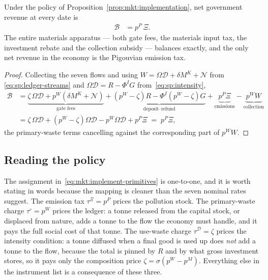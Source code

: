 \begin{corollary}\label{cor:mkt:budget}
Under the policy of Proposition~\ref{prop:mkt:implementation}, net government revenue at every date is
\begin{align}
\mathcal B &= p^P\,\Xi .
\label{eq:mkt:budget}
\end{align}
The entire materials apparatus --- both gate fees, the materials input tax, the investment rebate and
the collection subsidy --- balances exactly, and the only net revenue in the economy is the Pigouvian
emission tax.
\end{corollary}

\begin{proof}
Collecting the seven flows and using $W=\Omega\mathcal D+\delta M^K+\mathcal N$ from
\eqref{eq:sp:ledger-streams} and $\Omega\mathcal D=R-\Phi^IG$ from~\eqref{eq:sp:intensity},
\begin{align*}
\mathcal B &= \underbrace{\zeta\,\Omega\mathcal D+p^W\left(\delta M^K+\mathcal N\right)}_{\text{gate fees}}
+\underbrace{\left(p^W-\zeta\right)R-\Phi^I\left(p^W-\zeta\right)G}_{\text{deposit--refund}}
+\underbrace{p^P\Xi}_{\text{emissions}}
-\underbrace{p^WW}_{\text{collection}}
\\
&= \zeta\,\Omega\mathcal D+\left(p^W-\zeta\right)\Omega\mathcal D-p^W\Omega\mathcal D+p^P\Xi
\;=\;p^P\Xi ,
\end{align*}
the primary-waste terms cancelling against the corresponding part of $p^WW$.
\end{proof}

\subsection{Reading the policy}\label{sec:mkt:implementation:reading}

 The assignment
in~\eqref{eq:mkt:implement-primitives} is one-to-one, and it is worth stating in words because the
mapping is cleaner than the seven nominal rates suggest. The emission tax $\tau^\Xi=p^P$ prices the
pollution stock. The primary-waste charge $\tau^{\circ}=p^W$ prices the ledger: a tonne released from
the capital stock, or displaced from nature, adds a tonne to the flow the economy must handle, and it
pays the full social cost of that tonne. The use-waste charge $\tau^{\mathcal D}=\zeta$ prices the
intensity condition: a tonne diffused when a final good is used up does \emph{not} add a tonne to the
flow, because the total is pinned by $R$ and by what gross investment stores, so it pays only the
composition price $\zeta=\sigma\left(p^W-p^M\right)$. Everything else in the instrument list is a
consequence of these three.

